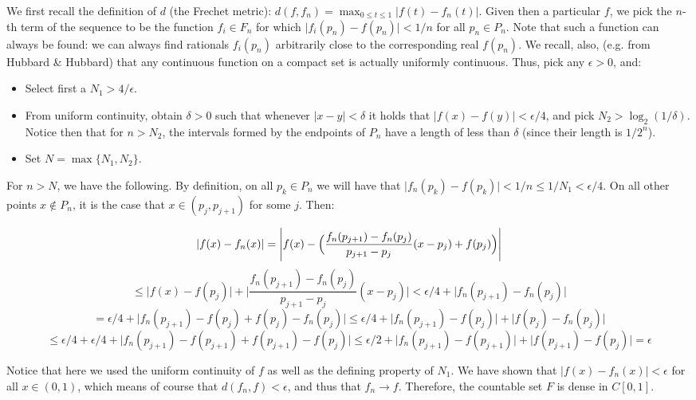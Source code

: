 \begin{solution}
    We first recall the definition of $d$ (the Frechet metric): $d(f, f_n) = \max_{0 \leq t \leq 1} \lvert f(t) - f_n(t) \rvert$. 
    Given then a particular $f$, we pick the $n$-th term of the sequence to be the function $f_i \in F_n$ for which $\lvert f_i(p_n) - f(p_n) \rvert < 1/n$ for all $p_n \in P_n$.
    Note that such a function can always be found: we can always find rationals $f_i(p_n)$ arbitrarily close to the corresponding real $f(p_n)$.
    We recall, also, (e.g. from Hubbard \& Hubbard) that any continuous function on a compact set is actually uniformly continuous.
    Thus, pick any $\epsilon > 0$, and:
    \begin{itemize}
        \item Select first a $N_1 > 4/\epsilon$.
        \item From uniform continuity, obtain $\delta > 0$ such that whenever $\lvert x - y \rvert < \delta$ it holds that $\lvert f(x) - f(y) \rvert < \epsilon/4$, and pick $N_2 > \log_2(1/\delta)$.
        Notice then that for $n > N_2$, the intervals formed by the endpoints of $P_n$ have a length of less than $\delta$ (since their length is $1/2^n$).
        \item Set $N = \max\{N_1, N_2\}$.
    \end{itemize}
    For $n > N$, we have the following.
    By definition, on all $p_k \in P_n$ we will have that $\lvert f_n(p_k) - f(p_k) \rvert < 1/n \leq 1/N_1 < \epsilon/4$.
    On all other points $x \notin P_n$, it is the case that $x \in (p_j, p_{j+1})$ for some $j$.
    Then:

    $$\lvert f(x) - f_n(x) \rvert = \Biggl\lvert f(x) - \Bigl(\frac{f_n(p_{j+1}) - f_n(p_j)}{p_{j+1} - p_j}(x - p_j) + f(p_j)\Bigr) \Biggr\rvert$$
    $$ \leq \lvert f(x) - f(p_j) \rvert + \Biggl\lvert \frac{f_n(p_{j+1}) - f_n(p_j)}{p_{j+1} - p_j}(x - p_j)\Biggr\rvert < \epsilon/4 + \lvert f_n(p_{j+1}) - f_n(p_j) \rvert$$
    $$ = \epsilon/4 + \lvert f_n(p_{j+1}) - f(p_j) + f(p_j) - f_n(p_j) \rvert \leq \epsilon/4 + \lvert f_n(p_{j+1}) - f(p_j) \rvert + \lvert f(p_j) - f_n(p_j) \rvert$$
    $$\leq \epsilon/4 + \epsilon/4 + \lvert f_n(p_{j+1}) - f(p_{j+1}) + f(p_{j+1}) - f(p_j) \rvert \leq \epsilon/2 + \lvert f_n(p_{j+1}) - f(p_{j+1}) \rvert + \lvert f(p_{j+1}) - f(p_j) \rvert = \epsilon$$

    Notice that here we used the uniform continuity of $f$ as well as the defining property of $N_1$.
    We have shown that $\lvert f(x) - f_n(x) \rvert < \epsilon$ for all $x \in (0, 1)$, which means of course that $d(f_n, f) < \epsilon$, and thus that $f_n \rightarrow f$.
    Therefore, the countable set $F$ is dense in $C[0, 1]$.
\end{solution}